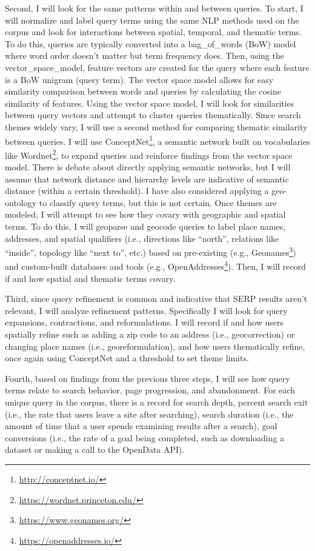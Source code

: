 Second, I will look for the same patterns within and between queries. To start, I will normalize and label query terms using the same NLP methods used on the corpus and look for interactions between spatial, temporal, and thematic terms. To do this, queries are typically converted into a \gls{bag_of_words} (\acrshort{BoW}) model where word order doesn't matter but term frequency does. Then, using the \gls{vector_space_model}, feature vectors are created for the query where each feature is a BoW unigram (query term). The vector space model allows for easy similarity comparison between words and queries by calculating the cosine similarity of features. Using the vector space model, I will look for similarities between query vectors and attempt to cluster queries thematically. Since search themes widely vary, I will use a second method for comparing thematic similarity between queries. I will use ConceptNet\footnote{\url{http://conceptnet.io/}}, a semantic network built on vocabularies like Wordnet\footnote{\url{https://wordnet.princeton.edu/}}, to expand queries and reinforce findings from the vector space model. There is debate about directly applying semantic networks, but I will assume that network distance and hierarchy levels are indicative of semantic distance (within a certain threshold). I have also considered applying a geo-ontology to classify query terms, but this is not certain. Once themes are modeled, I will attempt to see how they covary with geographic and spatial terms. To do this, I will geoparse and geocode queries to label place names, addresses, and spatial qualifiers (i.e., directions like “north”, relations like “inside”, topology like “next to”, etc.) based on pre-existing (e.g., Geonames\footnote{\url{https://www.geonames.org/}}) and custom-built databases and tools (e.g., OpenAddresses\footnote{\url{https://openaddresses.io/}}). Then, I will record if and how spatial and thematic terms covary.

Third, since query refinement is common and indicative that SERP results aren't relevant, I will analyze refinement patterns. Specifically I will look for query expansions, contractions, and reformulations. I will record if and how users spatially refine such as adding a zip code to an address (i.e., geocorrection) or changing place names (i.e., georeformulation), and how users thematically refine, once again using ConceptNet and a threshold to set theme limits.

Fourth, based on findings from the previous three steps, I will see how query terms relate to search behavior, page progression, and abandonment. For each unique query in the corpus, there is a record for search depth, percent search exit (i.e., the rate that users leave a site after searching), search duration (i.e., the amount of time that a user spends examining results after a search), goal conversions (i.e., the rate of a goal being completed, such as downloading a dataset or making a call to the OpenData API). 

